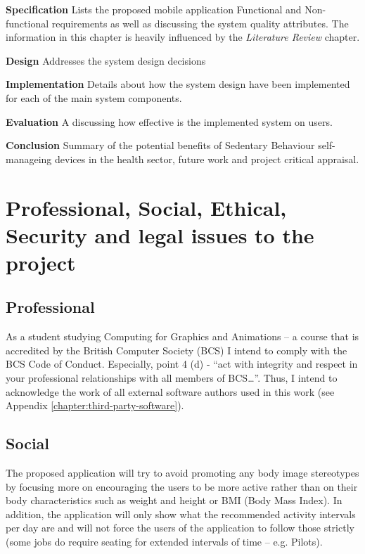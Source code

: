     
    \textbf{Specification} Lists the proposed mobile application Functional and Non-functional requirements as well as discussing the system quality attributes. The information in this chapter is heavily influenced by the \textit{Literature Review} chapter.\newline
    
    
    \textbf{Design} Addresses the system design decisions\newline
    
    
    \textbf{Implementation} Details about how the system design have been implemented for each of the main system components.\newline
    
    
    \textbf{Evaluation} A discussing how effective is the implemented system on users.\newline
    
    
    \textbf{Conclusion} Summary of the potential benefits of Sedentary Behaviour self-manageing devices in the health sector, future work and project critical appraisal.\newline
    
    
    \section{Professional, Social, Ethical, Security and legal issues to the project}
    
    \subsection{Professional}
    As a student studying Computing for Graphics and Animations – a course that is accredited by the British Computer Society (BCS) I intend to comply with the BCS Code of Conduct. Especially, point 4 (d) \citep{bcs_2017} - “act with integrity and respect in your professional relationships with all members of BCS…”. Thus, I intend to acknowledge the work of all external software authors used in this work (see Appendix \ref{chapter:third-party-software}).

    \subsection{Social}
    The proposed application will try to avoid promoting any body image stereotypes by focusing more on encouraging the users to be more active rather than on their body characteristics such as weight and height or BMI (Body Mass Index). In addition, the application will only show what the recommended activity intervals per day are and will not force the users of the application to follow those strictly (some jobs do require seating for extended intervals of time – e.g. Pilots).
    
